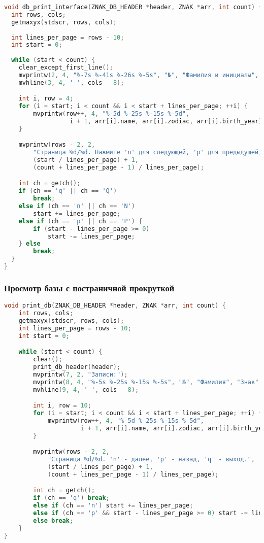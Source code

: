 \begin{lstlisting}[language=C, caption=Функция db\_print\_interface]
void db_print_interface(ZNAK_DB_HEADER *header, ZNAK *arr, int count) {
  int rows, cols;
  getmaxyx(stdscr, rows, cols);
  
  int lines_per_page = rows - 10;
  int start = 0;
  
  while (start < count) {
    clear_except_first_line();
    mvprintw(2, 4, "%-7s %-41s %-26s %-5s", "№", "Фамилия и инициалы", "Знак зодиака", "Год");
    mvhline(3, 4, '-', cols - 8);

    int i, row = 4;
    for (i = start; i < count && i < start + lines_per_page; ++i) {
        mvprintw(row++, 4, "%-5d %-25s %-15s %-5d",
                  i + 1, arr[i].name, arr[i].zodiac, arr[i].birth_year);
    }

    mvprintw(rows - 2, 2,
        "Страница %d/%d. Нажмите 'n' для следующей, 'p' для предыдущей, 'q' для выхода.",
        (start / lines_per_page) + 1,
        (count + lines_per_page - 1) / lines_per_page);

    int ch = getch();
    if (ch == 'q' || ch == 'Q')
        break;
    else if (ch == 'n' || ch == 'N')
        start += lines_per_page;
    else if (ch == 'p' || ch == 'P') {
        if (start - lines_per_page >= 0)
            start -= lines_per_page;
    } else
        break;
  }
}
\end{lstlisting}



\subsubsection*{Просмотр базы с постраничной прокруткой}
\begin{lstlisting}[language=C, caption=Функция print\_db]
void print_db(ZNAK_DB_HEADER *header, ZNAK *arr, int count) {
    int rows, cols;
    getmaxyx(stdscr, rows, cols);
    int lines_per_page = rows - 10;
    int start = 0;

    while (start < count) {
        clear();
        print_db_header(header);
        mvprintw(7, 2, "Записи:");
        mvprintw(8, 4, "%-5s %-25s %-15s %-5s", "№", "Фамилия", "Знак", "Год");
        mvhline(9, 4, '-', cols - 8);

        int i, row = 10;
        for (i = start; i < count && i < start + lines_per_page; ++i) {
            mvprintw(row++, 4, "%-5d %-25s %-15s %-5d",
                     i + 1, arr[i].name, arr[i].zodiac, arr[i].birth_year);
        }

        mvprintw(rows - 2, 2, 
            "Страница %d/%d. 'n' - далее, 'p' - назад, 'q' - выход.",
            (start / lines_per_page) + 1,
            (count + lines_per_page - 1) / lines_per_page);

        int ch = getch();
        if (ch == 'q') break;
        else if (ch == 'n') start += lines_per_page;
        else if (ch == 'p' && start - lines_per_page >= 0) start -= lines_per_page;
        else break;
    }
}
\end{lstlisting}

